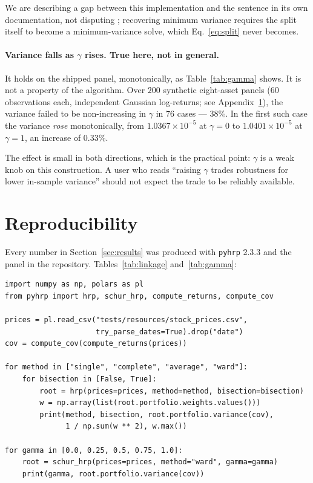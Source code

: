 \documentclass[11pt,a4paper]{article}
\newcommand{\code}[1]{\texttt{#1}}
\newcounter{algo}
\begin{document}
We are describing a gap between this implementation and the sentence in its own
documentation, not disputing \citet{cotton2024}; recovering minimum variance
requires the split itself to become a minimum-variance solve, which
Eq.~\eqref{eq:split} never becomes.

\paragraph{Variance falls as $\gamma$ rises. True here, not in general.}
It holds on the shipped panel, monotonically, as Table~\ref{tab:gamma} shows.
It is not a property of the algorithm. Over $200$ synthetic eight-asset panels
($60$ observations each, independent Gaussian log-returns; see
Appendix~\ref{app:repro}), the variance failed to be non-increasing in $\gamma$
in $76$ cases --- $38\%$. In the first such case the variance \emph{rose}
monotonically, from $1.0367 \times 10^{-5}$ at $\gamma=0$ to $1.0401
\times 10^{-5}$ at $\gamma=1$, an increase of $0.33\%$.

The effect is small in both directions, which is the practical point:
$\gamma$ is a weak knob on this construction. A user who reads
``raising $\gamma$ trades robustness for lower in-sample variance'' should not
expect the trade to be reliably available.

\section{Reproducibility}
\label{app:repro}

Every number in Section~\ref{sec:results} was produced with \code{pyhrp} 2.3.3
and the panel in the repository. Tables~\ref{tab:linkage} and~\ref{tab:gamma}:

\begin{verbatim}
import numpy as np, polars as pl
from pyhrp import hrp, schur_hrp, compute_returns, compute_cov

prices = pl.read_csv("tests/resources/stock_prices.csv",
                     try_parse_dates=True).drop("date")
cov = compute_cov(compute_returns(prices))

for method in ["single", "complete", "average", "ward"]:
    for bisection in [False, True]:
        root = hrp(prices=prices, method=method, bisection=bisection)
        w = np.array(list(root.portfolio.weights.values()))
        print(method, bisection, root.portfolio.variance(cov),
              1 / np.sum(w ** 2), w.max())

for gamma in [0.0, 0.25, 0.5, 0.75, 1.0]:
    root = schur_hrp(prices=prices, method="ward", gamma=gamma)
    print(gamma, root.portfolio.variance(cov))
\end{verbatim}
\end{document}
